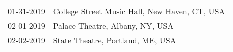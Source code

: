 \begin{supertabular}{ll}
 01-31-2019 &  College Street Music Hall, New Haven, CT, USA \\
 02-01-2019 &                Palace Theatre, Albany, NY, USA \\
 02-02-2019 &               State Theatre, Portland, ME, USA \\
\end{supertabular}
